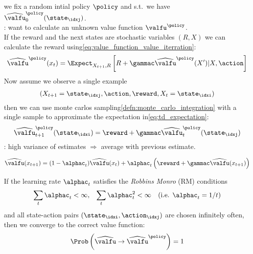 \begin{sectionbox}\nospacing
   we fix a random intial policy $\policy$ and s.t.\ we have $\widehat{\valfu}_{0}^{\policy}(\state_{\idxj})$.\\
  : want to calculate an unknown value function $\valfu^{\policy}$.\\
  If the reward and the next states are stochastic variables $(R,X)$ we can calculate the reward using\cref{eq:value_function_value_iterration}:
  \begin{align}
    \widehat{\valfu}^{\policy}(x_{t})=\Expect_{X_{t+1},R}\left[R+\gammac\widehat{\valfu}^{\policy}(X')|X,\action\right]\label{eq:td_expectation}
  \end{align}
  Now assume we observe a single example
  \begin{align*}
    (X_{t+1}=\state_{\idxj},\action,\reward, X_{t}=\state_{\idxi})
  \end{align*} then we can use monte carlos sampling\cref{defn:monte_carlo_integration} with a single sample to approximate the expectation in\cref{eq:td_expectation}:
  \begin{align*}
    \widehat{\valfu}_{t+1}^{\policy}(\state_{\idxi})=\reward+\gammac\widehat{\valfu}_{t}^{\policy}(\state_{\idxj})
  \end{align*}
  : high variance of estimates $\Rightarrow$ average with previous estimate.
\end{sectionbox}
\begin{defnbox}\nospacing
  \begin{defn}\label{defn:temporal_difference_learning}
    \begin{align}
      \widehat{\valfu}(x_{t+1})=(1-\alphac_{t})\widehat{\valfu}(x_{t})+\alphac_{t} \left(\reward+\gammac\widehat{\valfu}(x_{t+1})\right)
    \end{align}
  \end{defn}
\end{defnbox}
\begin{corbox}\nospacing
  \begin{cor}\label{cor:temporal_difference_necessary_condition_for_convergence}
    If the learning rate $\alphac_{t}$ satisfies the \textit{Robbins Monro} (RM) conditions
    \begin{align}
      \sum_{t}\alphac_{t}<\infty,&&\sum_{t}\alphac_{t}^{2}<\infty&&(\text{i.e. } \alphac_{t}=1/t)
    \end{align}
    and all state-action pairs $(\state_{\idxi},\action_{\idxj})$ are chosen infinitely often, then
    we converge to the correct value function:
    \begin{align}
      \Prob\left(\widehat{\valfu}\rightarrow\widehat{\valfu}^{\policy}\right)=1
    \end{align}
  \end{cor}
\end{corbox}

